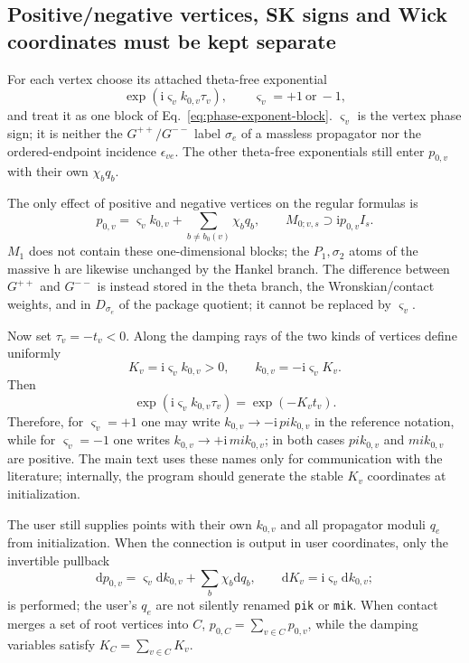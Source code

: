 \documentclass[11pt,a4paper]{article}
\newcommand{\dd}{\mathrm d}
\newcommand{\ii}{\mathrm i}
\begin{document}
\subsection{Positive/negative vertices, SK signs and Wick coordinates must be kept separate}

For each vertex choose its attached theta-free exponential
\begin{equation}
 \exp(\ii\varsigma_vk_{0,v}\tau_v),
 \qquad \varsigma_v=+1\ \text{or}\ -1,
 \label{eq:vertex-phase-sign}
\end{equation}
and treat it as one block of Eq.~\eqref{eq:phase-exponent-block}. $\varsigma_v$ is the vertex phase sign; it is neither the $G^{++}/G^{--}$ label $\sigma_e$ of a massless propagator nor the ordered-endpoint incidence $\epsilon_{ve}$. The other theta-free exponentials still enter $p_{0,v}$ with their own $\chi_bq_b$.

The only effect of positive and negative vertices on the regular formulas is
\begin{equation}
 p_{0,v}=\varsigma_vk_{0,v}+\sum_{b\neq b_0(v)}\chi_bq_b,
 \qquad
 M_{0;v,s}\supset\ii p_{0,v}I_s.
 \label{eq:signed-vertex-M0}
\end{equation}
$M_1$ does not contain these one-dimensional blocks; the $P_1,\sigma_2$ atoms of the massive h are likewise unchanged by the Hankel branch. The difference between $G^{++}$ and $G^{--}$ is instead stored in the theta branch, the Wronskian/contact weights, and in $D_{\sigma_e}$ of the package quotient; it cannot be replaced by $\varsigma_v$.

Now set $\tau_v=-t_v<0$. Along the damping rays of the two kinds of vertices define uniformly
\begin{equation}
 K_v=\ii\varsigma_vk_{0,v}>0,
 \qquad
 k_{0,v}=-\ii\varsigma_vK_v.
 \label{eq:unified-vertex-wick-coordinate}
\end{equation}
Then
\begin{equation}
 \exp(\ii\varsigma_vk_{0,v}\tau_v)=\exp(-K_vt_v).
\end{equation}
Therefore, for $\varsigma_v=+1$ one may write $k_{0,v}\to-\ii\,pik_{0,v}$ in the reference notation, while for $\varsigma_v=-1$ one writes $k_{0,v}\to+\ii\,mik_{0,v}$; in both cases $pik_{0,v}$ and $mik_{0,v}$ are positive. The main text uses these names only for communication with the literature; internally, the program should generate the stable $K_v$ coordinates at initialization.

The user still supplies points with their own $k_{0,v}$ and all propagator moduli $q_e$ from initialization. When the connection is output in user coordinates, only the invertible pullback
\begin{equation}
 \dd p_{0,v}=\varsigma_v\dd k_{0,v}+\sum_b\chi_b\dd q_b,
 \qquad
 \dd K_v=\ii\varsigma_v\dd k_{0,v};
 \label{eq:user-to-internal-coordinate-pullback}
\end{equation}
is performed; the user's $q_e$ are not silently renamed \texttt{pik} or \texttt{mik}. When contact merges a set of root vertices into $C$, $p_{0,C}=\sum_{v\in C}p_{0,v}$, while the damping variables satisfy $K_C=\sum_{v\in C}K_v$.
\end{document}
